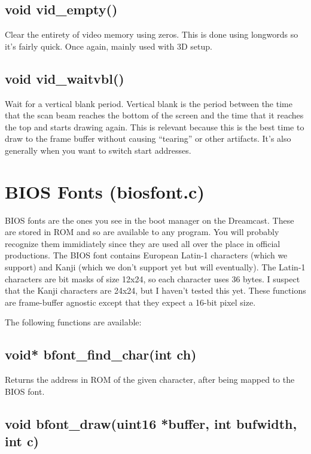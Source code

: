 \documentclass[english]{report}
\begin{document}
\subsection{void vid\_empty()}

Clear the entirety of video memory using zeros. This is done using
longwords so it's fairly quick. Once again, mainly used with 3D setup.


\subsection{void vid\_waitvbl()}

Wait for a vertical blank period. Vertical blank is the period between
the time that the scan beam reaches the bottom of the screen and the
time that it reaches the top and starts drawing again. This is relevant
because this is the best time to draw to the frame buffer without
causing ``tearing'' or other artifacts. It's also generally when
you want to switch start addresses.


\section{BIOS Fonts (biosfont.c)}

BIOS fonts are the ones you see in the boot manager on the Dreamcast.
These are stored in ROM and so are available to any program. You will
probably recognize them immidiately since they are used all over the
place in official productions. The BIOS font contains European Latin-1
characters (which we support) and Kanji (which we don't support yet
but will eventually). The Latin-1 characters are bit masks of size
12x24, so each character uses 36 bytes. I suspect that the Kanji characters
are 24x24, but I haven't tested this yet. These functions are frame-buffer
agnostic except that they expect a 16-bit pixel size.

The following functions are available:


\subsection{void* bfont\_find\_char(int ch)}

Returns the address in ROM of the given character, after being mapped
to the BIOS font. 


\subsection{void bfont\_draw(uint16 *buffer, int bufwidth, int c)}
\end{document}
